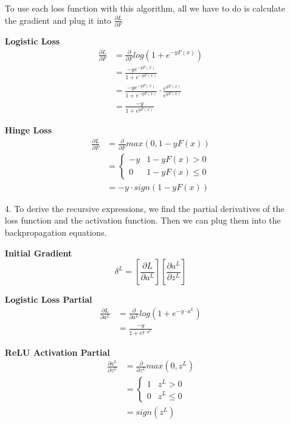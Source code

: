 \documentclass{article}
\begin{document}
\begin{enumerate}
            To use each loss function with this algorithm, all we have to do is calculate the gradient and plug it into \(\frac{\partial L}{\partial F}\)
            
            \textbf{Logistic Loss}
            \[
                \begin{aligned}
                    \frac{\partial L}{\partial F} & = \frac{\partial}{\partial F} log(1 + e^{-yF(x)}) \\
                    & = \frac{-ye^{-yF(x)}}{1 + e^{-yF(x)}} \\
                    & = \frac{-ye^{-yF(x)}}{1 + e^{-yF(x)}} \cdot \frac{e^{yF(x)}}{e^{yF(x)}} \\
                    & = \frac{-y}{1 + e^{yF(x)}}
                \end{aligned}
            \]
            
            \textbf{Hinge Loss}
            \[
                \begin{aligned}
                    \frac{\partial L}{\partial F} & = \frac{\partial}{\partial F} max(0, 1 - yF(x)) \\
                    & = \begin{cases}
                        -y & 1 - yF(x) > 0 \\
                        0 & 1 - yF(x) \leq 0
                    \end{cases} \\
                    & = -y \cdot sign(1 - yF(x))
                \end{aligned}
            \]

        \item[4.]
            To derive the recursive expressions, we find the partial derivatives of the loss function and the activation function. Then we can plug them into the backpropagation equations.

            \textbf{Initial Gradient}
                \[\delta^{L} = [\frac{\partial L}{\partial a^L}] [\frac{\partial a^L}{\partial z^L}]\]

            \textbf{Logistic Loss Partial}
            \[
                \begin{aligned}
                    \frac{\partial L}{\partial a^L} & = \frac{\partial}{\partial a^L} log(1 + e^{-y \cdot a^L}) \\
                    & = \frac{-y}{1 + e^{y \cdot a^L}}
                \end{aligned}
            \]

            \textbf{ReLU Activation Partial}
            \[
                \begin{aligned}
                    \frac{\partial a^L}{\partial z^L} & = \frac{\partial}{\partial z^L} max(0, z^L) \\
                    & = \begin{cases}
                        1 & z^L > 0 \\
                        0 & z^L \leq 0
                    \end{cases} \\
                    & = sign(z^L)
                \end{aligned}
            \]


\end{enumerate}
\end{document}
